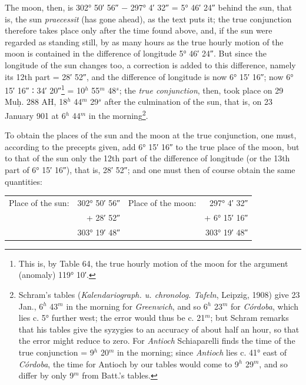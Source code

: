 \documentclass[11pt]{article}
\newcommand{\Pg}[1]{\marginpar{\footnotesize\color{gray}#1}}
\begin{document}
\addtocounter{footnote}{-2}
\par \Pg{83}The moon, then, is 302° 50′ 56″ − 297° 4′ 32″ = 5° 46′ 24″ behind the sun, that is, the sun \emph{praecessit} (has gone ahead), as the text puts it; the true conjunction therefore takes place only after the time found above, and, if the sun were regarded as standing still, by as many hours as the true hourly motion of the moon is contained in the difference of longitude 5° 46′ 24″. But since the longitude of the sun changes too, a correction is added to this difference, namely its 12th part = 28′ 52″, and the difference of longitude is now 6° 15′ 16″; now 6° 15′ 16″ {\SignFont\upshape ∶} 34′ 20″\footnote{This is, by Table 64, the true hourly motion of the moon for the argument (anomaly) 119° 10′.} = 10$^{h}$ 55$^{m}$ 48$^{s}$; the \emph{true conjunction}, then, took place on 29 Muḥ. 288 AH, 18$^{h}$ 44$^{m}$ 29$^{s}$ after the culmination of the sun, that is, on 23 January 901 at 6$^{h}$ 44$^{m}$ in the morning\footnote{Schram's tables (\emph{Kalendariograph. u. chronolog. Tafeln}, Leipzig, 1908) give 23 Jan., 6$^{h}$ 43$^{m}$ in the morning for \emph{Greenwich}, and so 6$^{h}$ 23$^{m}$ for \emph{Córdoba}, which lies c. 5° further west; the error would thus be c. 21$^{m}$; but Schram remarks that his tables give the syzygies to an accuracy of about half an hour, so that the error might reduce to zero. For \emph{Antioch} Schiaparelli finds the time of the true conjunction = 9$^{h}$ 20$^{m}$ in the morning; since \emph{Antioch} lies c. 41° east of \emph{Córdoba}, the time for Antioch by our tables would come to 9$^{h}$ 29$^{m}$, and so differ by only 9$^{m}$ from Batt.'s tables.}.\par
\par To obtain the places of the sun and the moon at the true conjunction, one must, according to the precepts given, add 6° 15′ 16″ to the true place of the moon, but to that of the sun only the 12th part of the difference of longitude (or the 13th part of 6° 15′ 16″), that is, 28′ 52″; and one must then of course obtain the same quantities:\par
\begin{center}\small\begin{tabular}{lrlr}
Place of the sun: & 302° 50′ 56″ & Place of the moon: & 297° 4′ 32″ \\
 & + 28′ 52″ &  & + 6° 15′ 16″ \\
 & 303° 19′ 48″ &  & 303° 19′ 48″ \\
\end{tabular}\end{center}
\end{document}
